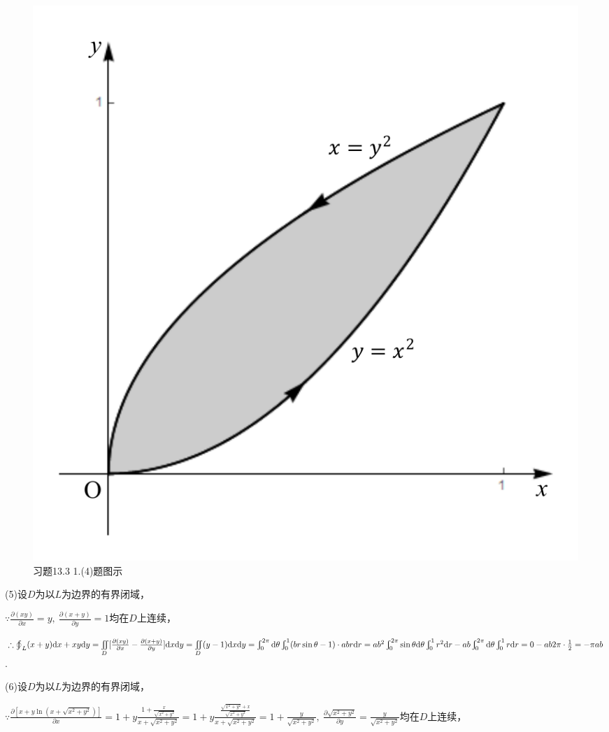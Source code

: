 \documentclass[12pt,UTF8]{ctexart}
\newcommand{\Int}[4]{\varint\nolimits_{#1}^{#2}#3\mathrm d#4}
\newcommand{\varIInt}[4]{\iint\limits_{#1}#2\mathrm d#3\mathrm d#4}
\newcommand{\BLOInt}[2]{\varoint\nolimits_{#1}#2}
\newcommand{\md}[1]{\mathrm d#1}
\begin{document}
\begin{enumerate}
\begin{figure}[H]
\begin{center}
\includegraphics[height=0.3\textheight]{Figures22/Fig13-3-1-4.pdf}
\end{center}
\caption{习题13.3 1.(4)题图示}
\label{13-3-1-4}
\end{figure}

(5)设$D$为以$L$为边界的有界闭域，

$\because\frac{\partial(xy)}{\partial x}=y,\ \frac{\partial(x+y)}{\partial y}=1$均在$D$上连续，

$\therefore\BLOInt L{(x+y)\md x+xy\md y}=\varIInt D{[\frac{\partial(xy)}{\partial x}-\frac{\partial(x+y)}{\partial y}]}xy=\varIInt D{(y-1)}xy\\
=\Int0{2\pi}{}\theta\Int01{(br\sin\theta-1)\cdot abr}r=ab^2\Int0{2\pi}{\sin\theta}\theta\Int01{r^2}r-ab\Int0{2\pi}{}\theta\Int01rr\\
=0-ab2\pi\cdot\frac12=-\pi ab$.

(6)设$D$为以$L$为边界的有界闭域，

$\because\frac{\partial[x+y\ln(x+\sqrt{x^2+y^2})]}{\partial x}=1+y\frac{1+\frac x{\sqrt{x^2+y^2}}}{x+\sqrt{x^2+y^2}}=1+y\frac{\frac{\sqrt{x^2+y^2}+x}{\sqrt{x^2+y^2}}}{x+\sqrt{x^2+y^2}}=1+\frac y{\sqrt{x^2+y^2}},\ \frac{\partial\sqrt{x^2+y^2}}{\partial y}=\frac y{\sqrt{x^2+y^2}}$均在$D$上连续，


\end{enumerate}
\end{document}
